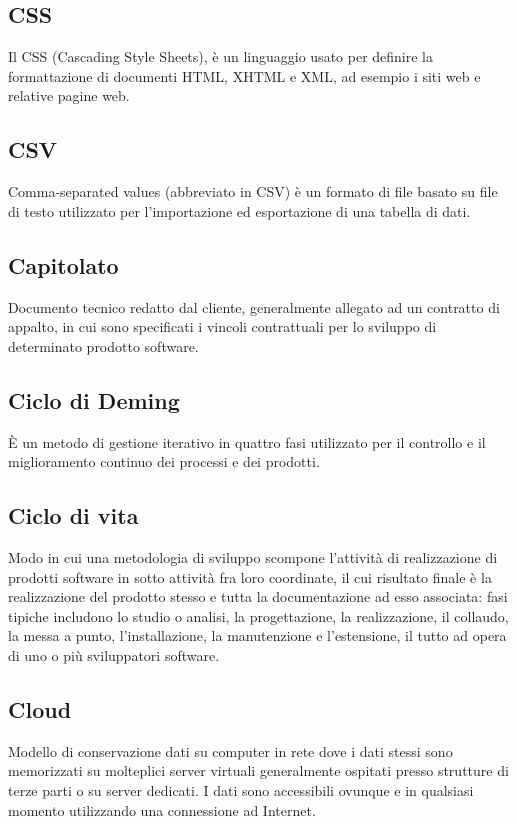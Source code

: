 \documentclass[../glossario.tex]{subfiles}
\begin{document}
\subsection*{CSS}
Il CSS (Cascading Style Sheets), è un linguaggio usato per definire la formattazione di documenti HTML, XHTML e XML, ad esempio i siti web e relative pagine web. 

\subsection*{CSV}
Comma-separated values (abbreviato in CSV) è un formato di file basato su file di testo utilizzato per l'importazione ed esportazione di una tabella di dati.

\subsection*{Capitolato}
Documento tecnico redatto dal cliente, generalmente allegato ad un contratto di appalto, in cui sono specificati i vincoli contrattuali per lo sviluppo di determinato prodotto software.


\subsection*{Ciclo di Deming}
È un metodo di gestione iterativo in quattro fasi utilizzato per il controllo e il miglioramento continuo dei processi e dei prodotti.


\subsection*{Ciclo di vita}
Modo in cui una metodologia di sviluppo scompone l'attività di realizzazione di prodotti software in sotto attività fra loro coordinate, il cui risultato finale è la realizzazione del prodotto stesso e tutta la documentazione ad esso associata: fasi tipiche includono lo studio o analisi, la progettazione, la realizzazione, il collaudo, la messa a punto, l'installazione, la manutenzione e l'estensione, il tutto ad opera di uno o più sviluppatori software.

\subsection*{Cloud}
Modello di conservazione dati su computer in rete dove i dati stessi sono memorizzati su molteplici server virtuali generalmente ospitati presso strutture di terze parti o su server dedicati. I dati sono accessibili ovunque e in qualsiasi momento utilizzando una connessione ad Internet.
\end{document}
